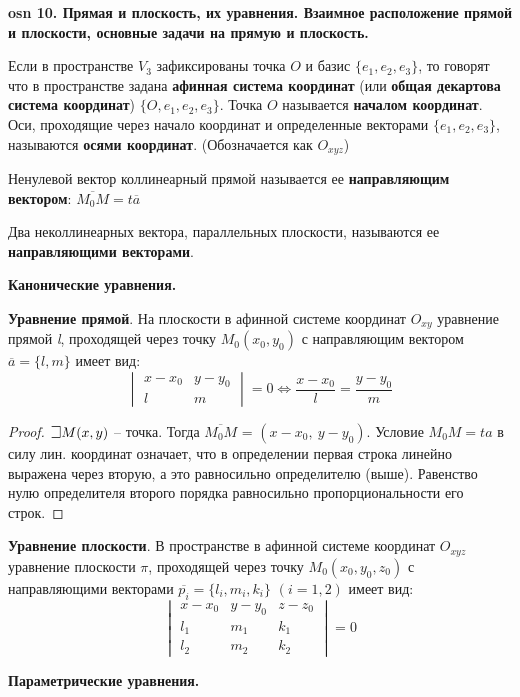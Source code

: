 \setcounter{section}{15}
\setcounter{subsection}{10}
\setcounter{equation}{0}
\textbf{\LARGE osn 10. Прямая и плоскость, их уравнения. Взаимное расположение прямой и плоскости,  основные задачи на прямую и плоскость.}

Если в пространстве $V_3$ зафиксированы точка $O$ и базис $\{e_1, e_2, e_3\}$, то говорят что в пространстве задана \textbf{афинная система координат} (или \textbf{общая декартова система координат}) $\{O, e_1, e_2, e_3\}$. Точка $O$ называется \textbf{началом координат}. Оси, проходящие через начало координат и определенные векторами $\{e_1, e_2, e_3\}$, называются \textbf{осями координат}. (Обозначается как $O_{xyz}$)

Ненулевой вектор коллинеарный прямой называется ее \textbf{направляющим вектором}: $\overline{M_0M} = t \overline{a}$   

Два неколлинеарных вектора, параллельных плоскости, называются ее \textbf{направляющими векторами}. 


\bigbreak
\centerline{\textbf{Канонические уравнения.}}

\textbf{Уравнение прямой}. На плоскости в афинной системе координат $O_{xy}$ уравнение прямой \textit{l}, проходящей через точку $M_0(x_0,y_0)$ с направляющим вектором $\overline{a}=\{l,m\}$ имеет вид:
$$\begin{vmatrix} x-x_0 & y-y_0 \\ l & m \end{vmatrix} = 0 \iff \frac{x-x_0}{l} = \frac{y-y_0}{m} $$
\begin{proof}
$\mathLet M(x,y)$ -- точка. Тогда $\overline{M_0M}$ = $(x - x_0, ~ y - y_0)$. Условие $M_0M = ta$ в силу лин. координат означает, что в определении первая строка линейно выражена через вторую, а это равносильно определителю (выше). Равенство нулю определителя второго порядка равносильно пропорциональности его строк.
\end{proof}


\textbf{Уравнение плоскости}. 
В пространстве в афинной системе координат $O_{xyz}$ уравнение плоскости $\pi$, проходящей через точку $M_0(x_0,y_0,z_0)$ с направляющими векторами $\overline{p_i}=\{l_i,m_i,k_i\}$ $(i=1,2)$ имеет вид:
$$\begin{vmatrix} x-x_0 & y-y_0 & z-z_0\\ l_1 & m_1 & k_1 \\ l_2 & m_2 & k_2 \end{vmatrix} = 0 $$

\bigbreak
\centerline{\textbf{Параметрические уравнения.}}

